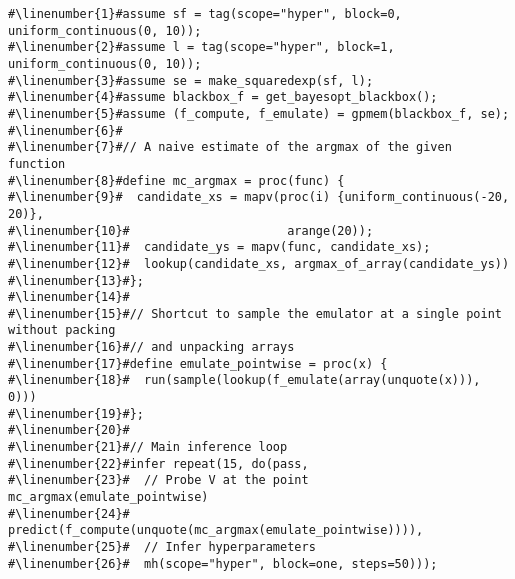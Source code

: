 \begin{mdframed}
\begin{minipage}{\linewidth}
\small
\belowcaptionskip=-10pt
\begin{lstlisting}[caption={Bayesian optimization using \gpmem},mathescape,numbers=none,label=alg:bayesopt,escapechar=\#]
#\linenumber{1}#assume sf = tag(scope="hyper", block=0, uniform_continuous(0, 10));
#\linenumber{2}#assume l = tag(scope="hyper", block=1, uniform_continuous(0, 10));
#\linenumber{3}#assume se = make_squaredexp(sf, l);
#\linenumber{4}#assume blackbox_f = get_bayesopt_blackbox();
#\linenumber{5}#assume (f_compute, f_emulate) = gpmem(blackbox_f, se);
#\linenumber{6}#
#\linenumber{7}#// A naive estimate of the argmax of the given function
#\linenumber{8}#define mc_argmax = proc(func) {
#\linenumber{9}#  candidate_xs = mapv(proc(i) {uniform_continuous(-20, 20)},
#\linenumber{10}#                      arange(20));
#\linenumber{11}#  candidate_ys = mapv(func, candidate_xs);
#\linenumber{12}#  lookup(candidate_xs, argmax_of_array(candidate_ys))
#\linenumber{13}#};
#\linenumber{14}#
#\linenumber{15}#// Shortcut to sample the emulator at a single point without packing
#\linenumber{16}#// and unpacking arrays
#\linenumber{17}#define emulate_pointwise = proc(x) {
#\linenumber{18}#  run(sample(lookup(f_emulate(array(unquote(x))), 0)))
#\linenumber{19}#};
#\linenumber{20}#
#\linenumber{21}#// Main inference loop
#\linenumber{22}#infer repeat(15, do(pass,
#\linenumber{23}#  // Probe V at the point mc_argmax(emulate_pointwise)
#\linenumber{24}#  predict(f_compute(unquote(mc_argmax(emulate_pointwise)))),
#\linenumber{25}#  // Infer hyperparameters
#\linenumber{26}#  mh(scope="hyper", block=one, steps=50)));
\end{lstlisting}

\end{minipage}
\end{mdframed}
